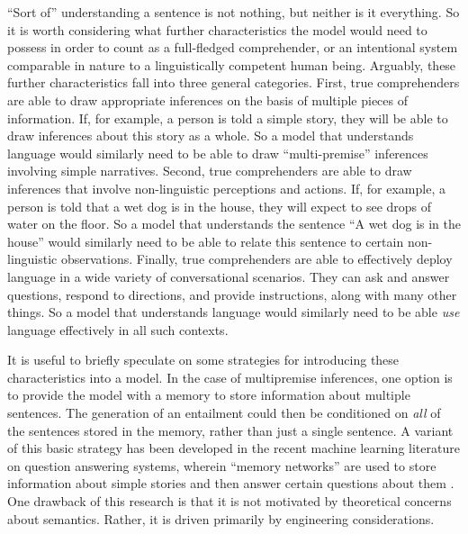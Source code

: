 ``Sort of'' understanding a sentence is not nothing, but neither is it everything. So it is worth considering what further characteristics the model would need to possess in order to count as a full-fledged comprehender, or an intentional system comparable in nature to a linguistically competent human being. Arguably, these further characteristics fall into three general categories. First, true comprehenders are able to draw appropriate inferences on the basis of multiple pieces of information. If, for example, a person is told a simple story, they will be able to draw inferences about this story as a whole. So a model that understands language would similarly need to be able to draw ``multi-premise'' inferences involving simple narratives. Second, true comprehenders are able to draw inferences that involve non-linguistic perceptions and actions. If, for example, a person is told that a wet dog is in the house, they will expect to see drops of water on the floor. So a model that understands the sentence ``A wet dog is in the house'' would similarly need to be able to relate this sentence to certain non-linguistic observations. Finally, true comprehenders are able to effectively deploy language in a wide variety of conversational scenarios. They can ask and answer questions, respond to directions, and provide instructions, along with many other things. So a model that understands language would similarly need to be able \textit{use} language effectively in all such contexts.

It is useful to briefly speculate on some strategies for introducing these characteristics into a model. In the case of multipremise inferences, one option is to provide the model with a memory to store information about multiple sentences. The generation of an entailment could then be conditioned on \textit{all} of the sentences stored in the memory, rather than just a single sentence. A variant of this basic strategy has been developed in the recent machine learning literature on question answering systems, wherein ``memory networks'' are used to store information about simple stories and then answer certain questions about them \citep{Weston:2016,Weston:2015,Sukhbataar:2015}. One drawback of this research is that it is not motivated by theoretical concerns about semantics. Rather, it is driven primarily by engineering considerations.

